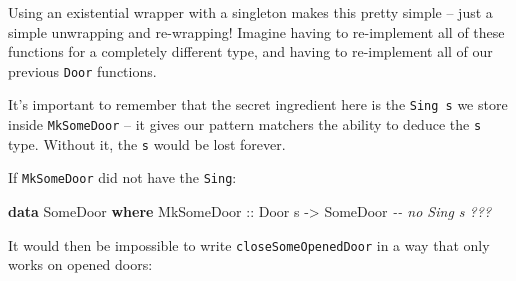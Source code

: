 \documentclass[]{article}
\newenvironment{Shaded}{}{}
\newcommand{\CommentTok}[1]{\textcolor[rgb]{0.38,0.63,0.69}{\textit{#1}}}
\newcommand{\DataTypeTok}[1]{\textcolor[rgb]{0.56,0.13,0.00}{#1}}
\newcommand{\KeywordTok}[1]{\textcolor[rgb]{0.00,0.44,0.13}{\textbf{#1}}}
\newcommand{\NormalTok}[1]{#1}
\newcommand{\OperatorTok}[1]{\textcolor[rgb]{0.40,0.40,0.40}{#1}}
\newcommand{\OtherTok}[1]{\textcolor[rgb]{0.00,0.44,0.13}{#1}}
\begin{document}
\begin{Shaded}
\end{Shaded}

Using an existential wrapper with a singleton makes this pretty simple -- just a
simple unwrapping and re-wrapping! Imagine having to re-implement all of these
functions for a completely different type, and having to re-implement all of our
previous \texttt{Door} functions.

It's important to remember that the secret ingredient here is the
\texttt{Sing\ s} we store inside \texttt{MkSomeDoor} -- it gives our pattern
matchers the ability to deduce the \texttt{s} type. Without it, the \texttt{s}
would be lost forever.

If \texttt{MkSomeDoor} did not have the \texttt{Sing}:

\begin{Shaded}
\begin{Highlighting}[]
\KeywordTok{data} \DataTypeTok{SomeDoor} \KeywordTok{where}
    \DataTypeTok{MkSomeDoor}\OtherTok{  ::} \DataTypeTok{Door}\NormalTok{ s }\OtherTok{{-}\textgreater{}} \DataTypeTok{SomeDoor}       \CommentTok{{-}{-} no Sing s ???}
\end{Highlighting}
\end{Shaded}

It would then be impossible to write \texttt{closeSomeOpenedDoor} in a way that
only works on opened doors:
\end{document}
